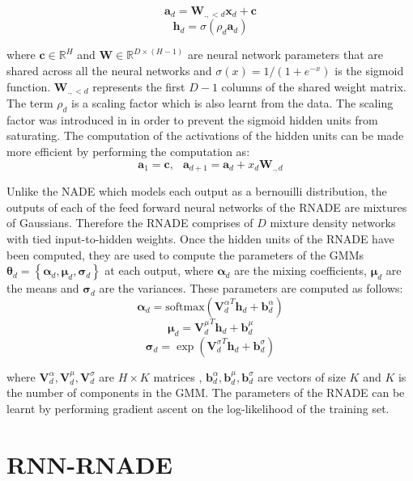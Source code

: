 \documentclass{article} %
\begin{document}
$$ \mathbf{a}_d = \boldsymbol{W}_{.,<d}\boldsymbol{x}_d + \mathbf{c}$$
$$ \boldsymbol{h}_d = \sigma (\rho_d \mathbf{a}_d)$$


where $\mathbf{c} \in \mathbb{R}^{H}$ and $\boldsymbol{W} \in \mathbb{R}^{D \times (H-1)}$ are neural network parameters that are shared across all the neural networks and $\sigma(x) = 1/(1+e^{-x})$ is the sigmoid function. $\boldsymbol{W}_{.,<d}$ represents the first $D-1$ columns of the shared weight matrix. The term $\rho_d$ is a scaling factor which is also learnt from the data. The scaling factor was introduced in \cite{AISTATS2011_Bengio11} in order to prevent the sigmoid hidden units from saturating. The computation of the activations of the hidden units can be made more efficient by performing the computation as:
$$ \mathbf{a}_1 = \mathbf{c}, \: \: \; \mathbf{a}_{d+1} = \mathbf{a}_{d} + x_d \mathbf{W}_{.,d}$$

 Unlike the NADE which models each output as a bernouilli distribution, the outputs of each of the feed forward neural networks of the RNADE are mixtures of Gaussians. Therefore the RNADE comprises of $D$ mixture density networks with tied input-to-hidden weights. Once the hidden units of the RNADE have been computed, they are used to compute the parameters of the GMMs $\boldsymbol{\theta}_d  = \left\{ \boldsymbol{\alpha}_d, \boldsymbol{\mu}_d, \boldsymbol{\sigma}_d \right\}$ at each output, where $\boldsymbol{\alpha}_d$ are the mixing coefficients, $\boldsymbol{\mu}_d$ are the means and $\boldsymbol{\sigma}_d$ are the variances. These parameters are computed as follows:
$$ \boldsymbol{\alpha}_d = \text{softmax} ({\mathbf{V}_{d}^{\alpha}}^T \mathbf{h}_d + \mathbf{b}^{\alpha}_{d})$$
$$ \boldsymbol{\mu}_d = {\mathbf{V}_{d}^{\mu}}^T \mathbf{h}_d + \mathbf{b}^{\mu}_{d}$$
$$ \boldsymbol{\sigma}_d = \exp ({\mathbf{V}_{d}^{\sigma}}^T \mathbf{h}_d + \mathbf{b}^{\sigma}_{d})$$

where $ \mathbf{V}_{d}^{\alpha},\mathbf{V}_{d}^{\mu},\mathbf{V}_{d}^{\sigma}$ are $H \times K$ matrices , $\mathbf{b}^{\alpha}_{d},\mathbf{b}^{\mu}_{d},\mathbf{b}^{\sigma}_{d}$ are vectors of size $K$ and $K$ is the number of components in the GMM. The parameters of the RNADE can be learnt by performing gradient ascent on the log-likelihood of the training set. 

\section{RNN-RNADE}
\label{RNN-RNADE}
\end{document}
